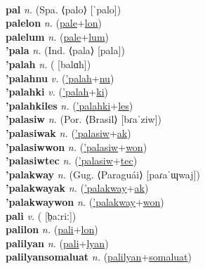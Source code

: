  \label{pale} \\
\textbf{pal} \textit{n.} (Spa. ⟨palo⟩ [ˈpalo])
 \label{pal} \\
\textbf{palelon} \textit{n.} (\hyperref[pale]{pale}+\hyperref[lon]{lon})
 \label{palelon} \\
\textbf{palelum} \textit{n.} (\hyperref[pale]{pale}+\hyperref[lum]{lum})
 \label{palelum} \\
\textbf{'pala} \textit{n.} (Ind. ⟨pala⟩ [pala])
 \label{'pala} \\
\textbf{'palah} \textit{n.} ( [balɑħ])
 \label{'palah} \\
\textbf{'palahnu} \textit{v.} (\hyperref['palah]{'palah}+\hyperref[nu]{nu})
 \label{'palahnu} \\
\textbf{'palahki} \textit{v.} (\hyperref['palah]{'palah}+\hyperref[ki]{ki})
 \label{'palahki} \\
\textbf{'palahkiles} \textit{n.} (\hyperref['palahki]{'palahki}+\hyperref[les]{les})
 \label{'palahkiles} \\
\textbf{'palasiw} \textit{n.} (Por. ⟨Brasil⟩ [bɾaˈziw])
 \label{'palasiw} \\
\textbf{'palasiwak} \textit{n.} (\hyperref['palasiw]{'palasiw}+\hyperref[ak]{ak})
 \label{'palasiwak} \\
\textbf{'palasiwwon} \textit{n.} (\hyperref['palasiw]{'palasiw}+\hyperref[won]{won})
 \label{'palasiwwon} \\
\textbf{'palasiwtec} \textit{n.} (\hyperref['palasiw]{'palasiw}+\hyperref[tec]{tec})
 \label{'palasiwtec} \\
\textbf{'palakway} \textit{n.} (Gug. ⟨Paraguái⟩ [paɾaˈɰwaj])
 \label{'palakway} \\
\textbf{'palakwayak} \textit{n.} (\hyperref['palakway]{'palakway}+\hyperref[ak]{ak})
 \label{'palakwayak} \\
\textbf{'palakwaywon} \textit{n.} (\hyperref['palakway]{'palakway}+\hyperref[won]{won})
 \label{'palakwaywon} \\
\textbf{pali} \textit{v.} ( [b̤aːriː])
 \label{pali} \\
\textbf{palilon} \textit{n.} (\hyperref[pali]{pali}+\hyperref[lon]{lon})
 \label{palilon} \\
\textbf{palilyan} \textit{n.} (\hyperref[pali]{pali}+\hyperref[lyan]{lyan})
 \label{palilyan} \\
\textbf{palilyansomaluat} \textit{n.} (\hyperref[palilyan]{palilyan}+\hyperref[somaluat]{somaluat})
 \label{palilyansomaluat} \\
